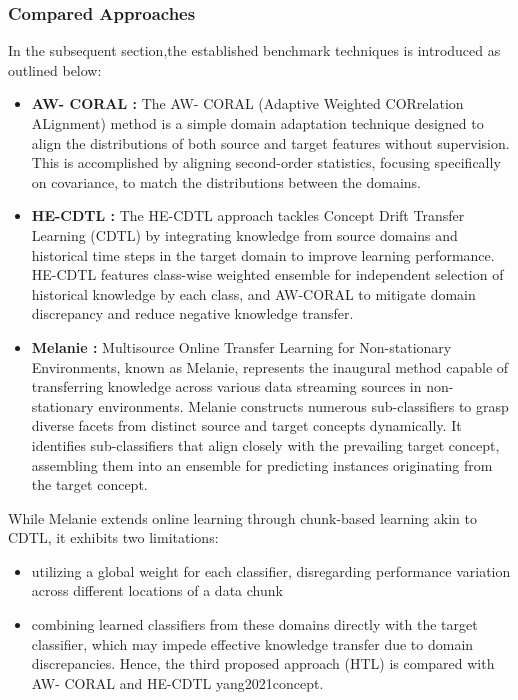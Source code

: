   \subsubsection{Compared Approaches}
  In the subsequent section,the established benchmark techniques is introduced as outlined below:
  \begin{itemize}
    \item \textbf{AW- CORAL \cite{sun2016return}:} The AW- CORAL (Adaptive Weighted CORrelation ALignment) method is a simple domain adaptation technique designed to align the distributions of both source and target features without supervision. This is accomplished by aligning second-order statistics, focusing specifically on covariance, to match the distributions between the domains.
    \item \textbf{HE-CDTL \cite{sun2016return}:} The HE-CDTL approach tackles Concept Drift Transfer Learning (CDTL) by integrating knowledge from source domains and historical time steps in the target domain to improve learning performance. HE-CDTL features class-wise weighted ensemble for independent selection of historical knowledge by each class, and AW-CORAL to mitigate domain discrepancy and reduce negative knowledge transfer.
    \item \textbf{Melanie \cite{dong2019multistream}:} Multisource Online Transfer Learning for Non-stationary Environments, known as Melanie, represents the inaugural method capable of transferring knowledge across various data streaming sources in non-stationary environments. Melanie constructs numerous sub-classifiers to grasp diverse facets from distinct source and target concepts dynamically. It identifies sub-classifiers that align closely with the prevailing target concept, assembling them into an ensemble for predicting instances originating from the target concept.
  \end{itemize}

While Melanie extends online learning through chunk-based learning akin to CDTL, it exhibits two limitations: 
\begin{itemize}
  \item utilizing a global weight for each classifier, disregarding performance variation across different locations of a data chunk
  \item combining learned classifiers from these domains directly with the target classifier, which may impede effective knowledge transfer due to domain discrepancies. Hence, the third proposed approach (HTL) is compared with AW- CORAL \cite{sun2016return} and HE-CDTL yang2021concept.
\end{itemize}


